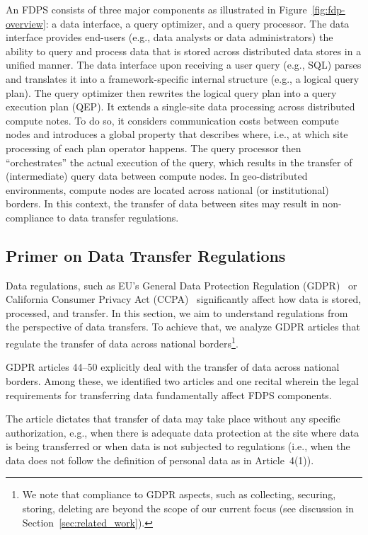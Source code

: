 \documentclass[11pt]{article}
\begin{document}
An FDPS consists of three major components as illustrated in
Figure~\ref{fig:fdp-overview}: a data interface, a query
optimizer, and a query processor. The data interface
provides end-users (e.g., data analysts or data
administrators) the ability to query and process data that
is stored across distributed data stores in a unified
manner. The data interface upon receiving a user query
(e.g., SQL) parses and translates it into a
framework-specific internal structure (e.g., a logical query
plan). The query optimizer then rewrites the logical query
plan into a query execution plan (QEP). It extends a
single-site data processing across distributed compute
notes. To do so,  it considers communication costs between
compute nodes and introduces a global property that
describes where, i.e., at which site processing of each plan
operator happens. The query processor then ``orchestrates''
the actual execution of the query, which results in the
transfer of (intermediate) query data between compute nodes.
In geo-distributed environments, compute nodes are located
across national (or institutional) borders. In this context,
the transfer of data between sites may result in
non-compliance to data transfer regulations.



\subsection{Primer on Data Transfer Regulations} %
\label{sub:primer_on_data_transfer_regulations}

Data regulations, such as EU's General Data Protection
Regulation (GDPR)~\cite{gdpr} or California Consumer Privacy
Act (CCPA)~\cite{ccpa} significantly affect how data is
stored, processed, and transfer. In this section, we aim to
understand regulations from the perspective of data
transfers. To achieve that, we analyze GDPR articles that
regulate the transfer of data across national
borders\footnote{We note that compliance to GDPR aspects,
such as collecting, securing, storing, deleting are beyond
the scope of our current focus (see discussion in
Section~\ref{sec:related_work}).}.


GDPR articles 44--50 explicitly deal with the transfer of
data across national borders. Among these, we identified two
articles and one recital wherein the legal requirements for
transferring data fundamentally affect FDPS components.



 The article dictates that transfer of
data may take place without any specific authorization,
e.g., when there is adequate data protection at the site
where data is being transferred or when data is not
subjected to regulations (i.e., when the data does not
follow the definition of personal data as in Article~4(1)).
\end{document}
